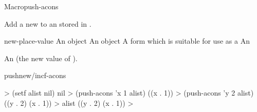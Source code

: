 \documentclass[10pt,twoside,english,pdftex]{article}
\begin{document}

\begin{functiondoc}{Macro}{push-acons}{
    \returns{} } 
%
%
  
\fnsyntax

\fnpurpose Add a new   to an
 stored in .

\fnpackage {}

\fnmodule {}

\fnargs
\begin{args}{new-place-value}
\arg[item] An object
\arg[value] An object
\arg[place] A form which is suitable for use as a
 An 
\end{args}

\fnreturns An  (the new value of
). 

\begin{alsos}{pushnew/incf-acons}
\end{alsos}

\fnexamples
%
\W\supp
\begin{example}
  > (setf alist nil)
  nil
  > (push-acons 'x 1 alist)
  ((x . 1))\goodpagebreak
  > (push-acons 'y 2 alist)
  ((y . 2) (x . 1))
  > alist
  ((y . 2) (x . 1))
  >
\end{example}

\end{functiondoc}

\end{document}
